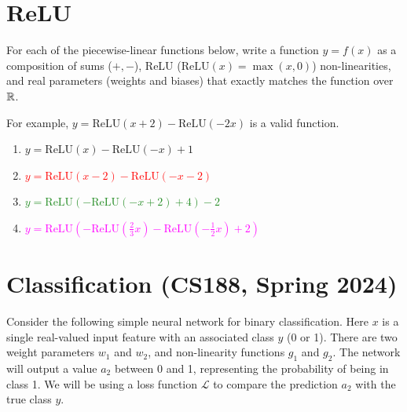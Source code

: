 \documentclass[11pt, a4paper]{article}
\def\ReLU{\mathrm{ReLU}}
\begin{document}
\newpage 

\section{ReLU}

For each of the piecewise-linear functions below, write a function $y = f(x)$ as a composition of sums ($+, -$), ReLU ($\mathrm{ReLU}(x) = \max(x, 0)$) non-linearities, and real parameters (weights and biases) that exactly matches the function over $\mathbb{R}$.

\begin{center}
\end{center}

For example, $y = \ReLU(x + 2) - \ReLU(-2x)$ is a valid function.

\begin{solution}
    \begin{enumerate}
        \item \textcolor{NavyBlue}{$y = \ReLU(x) - \ReLU(-x) + 1$}
        \item \textcolor{Red}{$y = \ReLU(x - 2) - \ReLU(-x - 2)$}
        \item \textcolor{ForestGreen}{$y = \ReLU(-\ReLU(-x + 2) + 4) - 2$}
        \item \textcolor{Fuchsia}{$y = \ReLU(-\ReLU(\frac{2}{3} x) - \ReLU(-\frac{1}{2} x) + 2)$}
    \end{enumerate}
\end{solution}

\newpage

\section{Classification (CS188, Spring 2024)}
Consider the following simple neural network for binary classification. Here $x$ is a single real-valued input feature with an associated class $y$ (0 or 1). There are two weight parameters $w_1$ and $w_2$, and non-linearity functions $g_1$ and $g_2$. The network will output a value $a_2$ between 0 and 1, representing the probability of being in class 1. We will be using a loss function $\mathcal{L}$ to compare the prediction $a_2$ with the true class $y$.
\end{document}
